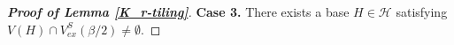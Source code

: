 \documentclass[11pt, a4paper]{article}
\theoremstyle{definition}
\newcommand{\<}{\subseteq}
\begin{document}
\begin{proof}[\bf Proof of Lemma \ref{K_r-tiling}]


\medskip
\textbf{Case 3.} There exists a base $H\in \mathcal{H}$ satisfying   $V(H)\cap V_{ex}^S(\beta/2)\ne \emptyset.$
\medskip


\end{proof}
\end{document}
